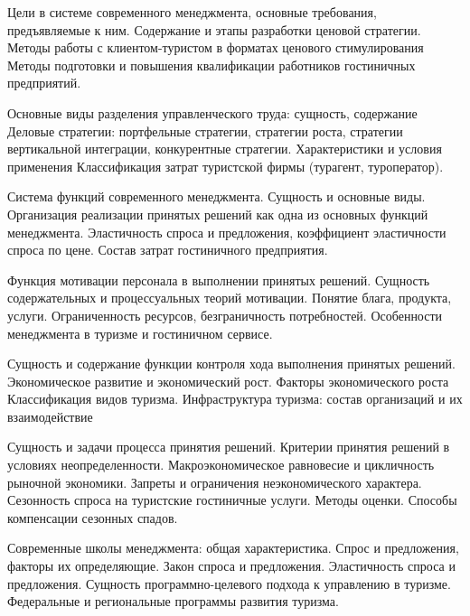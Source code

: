 \documentclass[
	11pt,
	a4paper,
	]
	{article}
\begin{document}
\bigskip

\noindent{} 
	{
		Цели в системе современного менеджмента, основные требования, предъявляемые к ним.
	}{
		Содержание и этапы разработки ценовой стратегии. Методы работы с клиентом-туристом в форматах ценового стимулирования
	}{
		Методы подготовки и повышения квалификации работников гостиничных предприятий.
	}

\bigskip

\noindent{} 
	{
		Основные виды разделения управленческого труда: сущность, содержание
	}{
		Деловые стратегии: портфельные стратегии, стратегии роста, стратегии вертикальной интеграции, конкурентные стратегии. Характеристики и условия применения
	}{
		Классификация затрат туристской фирмы (турагент, туроператор).
	}

\bigskip

\noindent{} 
	{
		Система функций современного менеджмента. Сущность и основные виды. Организация реализации принятых решений как одна из основных функций менеджмента.
	}{
		Эластичность спроса и предложения, коэффициент эластичности спроса по цене.
	}{
		Состав затрат гостиничного предприятия.
	}

\bigskip

\noindent{} 
	{
		Функция мотивации персонала в выполнении принятых решений. Сущность содержательных и процессуальных теорий мотивации.
	}{
		Понятие блага, продукта, услуги. Ограниченность ресурсов, безграничность потребностей.
	}{
		Особенности менеджмента в туризме и гостиничном сервисе.
	}

\bigskip

\noindent{} 
	{
		Сущность и содержание функции контроля хода выполнения принятых решений.
	}{
		Экономическое развитие и экономический рост. Факторы экономического роста
	}{
		Классификация видов туризма. Инфраструктура туризма: состав организаций и их взаимодействие
	}

\bigskip

\noindent{} 
	{
		Сущность и задачи процесса принятия решений. Критерии принятия решений в условиях неопределенности.
	}{
		Макроэкономическое равновесие и цикличность рыночной экономики. Запреты и ограничения неэкономического характера.
	}{
		Сезонность спроса на туристские гостиничные услуги. Методы оценки. Способы компенсации сезонных спадов.
	}

\bigskip

\noindent{} 
	{
		Современные школы менеджмента: общая характеристика.
	}{
		Спрос и предложения, факторы их определяющие. Закон спроса и предложения. Эластичность спроса и предложения.
	}{
		Сущность программно-целевого подхода к управлению в туризме. Федеральные и региональные программы развития туризма.
	}
\end{document}
